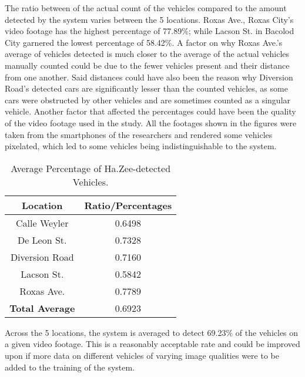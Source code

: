 The ratio between of the actual count of the vehicles compared to the amount detected by the system varies between the 5 locations. Roxas Ave., Roxas City’s video footage has the highest percentage of 77.89\%; while Lacson St. in Bacolod City garnered the lowest percentage of 58.42\%. A factor on why Roxas Ave.’s average of vehicles detected is much closer to the average of the actual vehicles manually counted could be due to the fewer vehicles present and their distance from one another. Said distances could have also been the reason why Diversion Road’s detected cars are significantly lesser than the counted vehicles, as some cars were obstructed by other vehicles and are sometimes counted as a singular vehicle. Another factor that affected the percentages could have been the quality of the video footage used in the study. All the footages shown in the figures were taken from the smartphones of the researchers and rendered some vehicles pixelated, which led to some vehicles being indistinguishable to the system. 



\begin{table}[ht]   %
	\centering
	\caption{Average Percentage of Ha.Zee-detected Vehicles.} \vspace{0.25em}
	\begin{tabular}{|c|c|} \hline
		\centering \textbf {Location} & \textbf {Ratio/Percentages} \\ \hline
		Calle Weyler & 0.6498 \\ \hline
		De Leon St. & 0.7328 	\\ \hline
		Diversion Road& 0.7160   \\ \hline
		Lacson St.   & 0.5842  \\ \hline
		Roxas Ave.  & 0.7789 \\ \hline
		
		\textbf{Total Average} & 0.6923 \\ \hline
		
	\end{tabular}
	\label{tab:avg_perc}
\end{table}


Across the 5 locations, the system is averaged to detect 69.23\% of the vehicles on a given video footage. This is a reasonably acceptable rate and could be improved upon if more data on different vehicles of varying image qualities were to be added to the training of the system.